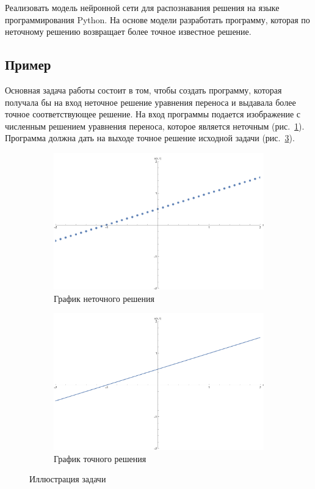 \documentclass[12pt, a4paper]{article}
\begin{document}
Реализовать модель нейронной сети для распознавания решения на языке программирования Python. На основе модели разработать программу, которая по неточному решению возвращает более точное известное решение.

\subsection{Пример}
Основная задача работы состоит в том, чтобы создать программу, которая получала бы на вход неточное решение уравнения переноса и выдавала более точное соответствующее решение. На вход программы подается изображение с численным решением уравнения переноса, которое является неточным (рис.~\ref{image1}). Программа должна дать на выходе точное решение исходной задачи (рис.~\ref{image2}).

\begin{figure}[h]
	\begin{subfigure}[b]{0.5\textwidth}
		\includegraphics[width=\textwidth]{primer1_1}
		\caption{График неточного решения}
		\label{image1}
	\end{subfigure}
	\hfill
	\begin{subfigure}[b]{0.5\textwidth}
		\includegraphics[width=\textwidth]{primer1_2}
		\caption{График точного решения}
		\label{image2}
	\end{subfigure}
	\caption{Иллюстрация задачи}
\end{figure}
\end{document}
